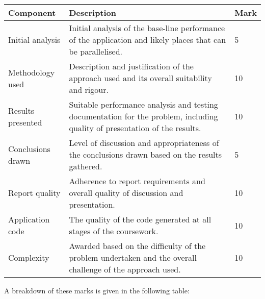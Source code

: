\documentclass[a4paper, 12pt]{article}
\begin{document}
\begin{table}[H]
	\centering
	\begin{tabularx}{\textwidth}{|l|X|l|}
		\hline
		\textbf{Component} & \textbf{Description} & \textbf{Mark} \\
		\hline
		Initial analysis & Initial analysis of the base-line performance of the application and likely places that can be parallelised. & 5 \\
		\hline
		Methodology used & Description and justification of the approach used and its overall suitability and rigour. & 10 \\
		\hline
		Results presented & Suitable performance analysis and testing documentation for the problem, including quality of presentation of the results. & 10 \\
		\hline
		Conclusions drawn & Level of discussion and appropriateness of the conclusions drawn based on the results gathered. & 5 \\
		\hline
		Report quality & Adherence to report requirements and overall quality of discussion and presentation. &	10 \\
		\hline
		Application code & The quality of the code generated at all stages of the coursework. & 10 \\
		\hline
		Complexity & Awarded based on the difficulty of the problem undertaken and the overall challenge of the approach used. & 10 \\
		\hline
	\end{tabularx}
\end{table}

A breakdown of these marks is given in the following table:
\end{document}
